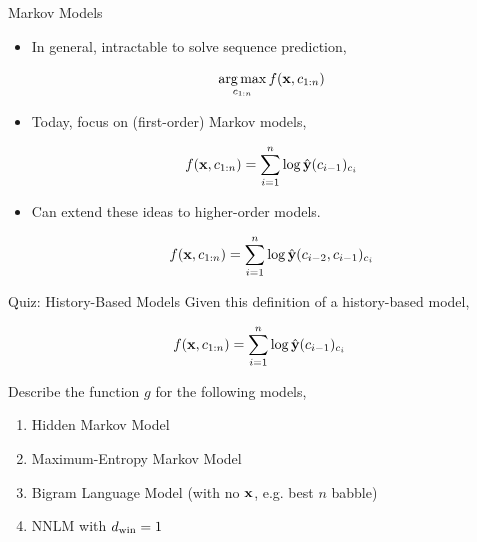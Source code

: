 \documentclass{beamer}
\begin{document}
\begin{frame}{Markov Models}
  \begin{itemize}
  \item In general, intractable to solve sequence prediction,
 
  \[ \argmax_{c_{1:n}} f(\boldx, c_{1:n}) \] 

  \item Today, focus on (first-order) Markov models,

  \[ f(\mathbf{x}, c_{1:n})  = \sum_{i=1}^n \log \hat{\mathbf{y}}(c_{i-1})_{c_i}\] 

  \item Can extend these ideas to higher-order models.

  \[ f(\mathbf{x}, c_{1:n})  = \sum_{i=1}^n \log \hat{\mathbf{y}}(c_{i-2}, c_{i-1})_{c_i}\] 
  \end{itemize}  
  
\end{frame}

\begin{frame}{Quiz: History-Based Models}
  Given this definition of a history-based model, 

  \[ f(\mathbf{x}, c_{1:n})  = \sum_{i=1}^n \log \hat{\mathbf{y}}(c_{i-1})_{c_i} \] 

  Describe the function $g$ for the following models, 

  \begin{enumerate}
  \item Hidden Markov Model
  \item Maximum-Entropy Markov Model
  \item Bigram Language Model (with no $\mathbf{x}$, e.g. best $n$ babble)
  \item NNLM with ${d_{\mathrm{win}}}=1$
  \end{enumerate}
\end{frame}
\end{document}
